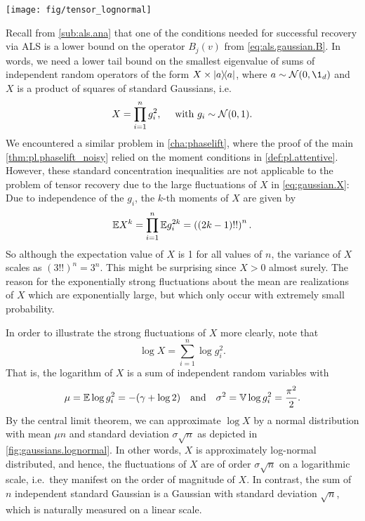\begin{figure*}
  \centering
  \texttt{[image: fig/tensor\_lognormal]}
  \caption{%
    Distribution function of $\log X$ given by \cref{eq:gaussian.X} for different numbers of factors $n$.
    The histogram is taken over 100,000 samples and the solid line depicts the probability density function of a normal random variable with mean $\mu n$ and standard deviation $\sigma \sqrt n$.
    Here, $\mu$ and $\sigma$ denotes the mean and standard deviation of $\log g_i^2$ as given by \cref{eq:gaussian.means_and_std}.
    }%
  \label{fig:gaussians.lognormal}
\end{figure*}


Recall from \cref{sub:als.ana} that one of the conditions needed for successful recovery via ALS is a lower bound on the operator $B_j(v)$ from \cref{eq:als.gaussian.B}.
In words, we need a lower tail bound on the smallest eigenvalue of sums of independent random operators of the form $X \times \ketbra{a}$, where $a \sim \Normal(0, \1_d)$ and $X$ is a product of squares of standard Gaussians, i.e.
\[
  \label{eq:gaussian.X}
  X = \prod_{i=1}^n g_i^2, \quad\mbox{ with } g_i \sim \mathcal{N}(0, 1).
\]
We encountered a similar problem in \cref{cha:phaselift}, where the proof of the main \cref{thm:pl.phaselift_noisy} relied on the moment conditions in \cref{def:pl.attentive}.
However, these standard concentration inequalities are not applicable to the problem of tensor recovery due to the large fluctuations of $X$ in \cref{eq:gaussian.X}:
Due to independence of the $g_i$, the $k$-th moments of $X$ are given by
\[
  \mathbb{E} X^k = \prod_{i=1}^n \mathbb{E} g_i^{2k} = \left( (2k - 1)!! \right)^n.
\]
So although the expectation value of $X$ is 1 for all values of $n$, the variance of $X$ scales as $(3!!)^n = 3^n$.
This might be surprising since $X > 0$ almost surely.
The reason for the exponentially strong fluctuations about the mean are realizations of $X$ which are exponentially large, but which only occur with extremely small probability.

In order to illustrate the strong fluctuations of $X$ more clearly, note that
\[
  \log X = \sum_{i=1}^n \log g_i^2.
\]
That is, the logarithm of $X$ is a sum of independent random variables with
\[
  \label{eq:gaussian.means_and_std}
  \mu = \mathbb{E} \log g_i^2 = -(\gamma + \log 2)
  \quad\mbox{and}\quad
  \sigma^2 = \mathbb{V} \log g_i^2 = \frac{\pi^2}{2}.
\]
By the central limit theorem, we can approximate $\log X$ by a normal distribution with mean $\mu n$ and standard deviation $\sigma \sqrt{n}$ as depicted in \cref{fig:gaussians.lognormal}.
In other words, $X$ is approximately log-normal distributed, and hence, the fluctuations of $X$ are of order $\sigma \sqrt{n}$ on a logarithmic scale, i.e.\ they manifest on the order of magnitude of $X$.
In contrast, the sum of $n$ independent standard Gaussian is a Gaussian with standard deviation $\sqrt{n}$, which is naturally measured on a linear scale.\\



